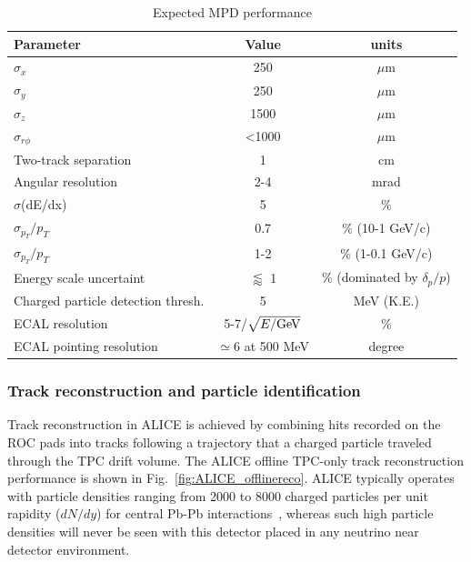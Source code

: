 \begin{table}[h]
    \centering
    \caption{Expected MPD performance}
\begin{tabular}{l|c|c}
\hline
Parameter	               & Value	                      & units \\
\hline
$\sigma_x$ 		           & 250	                      & $\mu$m\\
$\sigma_y$ 		           & 250	                      & $\mu$m\\
$\sigma_z$ 		           & 1500	                      & $\mu$m\\
$\sigma_{r\phi}$ 	       & <1000	                      & $\mu$m\\
Two-track separation       & 1		                      & cm \\
Angular resolution	       & 2-4	                      & mrad \\
$\sigma$(dE/dx)		       & 5		                      & \% \\ 
$\sigma_{p_T}/p_T$	       & 0.7	                      & \% (10-1 GeV/c)\\
$\sigma_{p_T}/p_T$	       & 1-2	                      & \% (1-0.1 GeV/c)\\
Energy scale uncertaint    & $\lessapprox$ 1              & \% (dominated by $\delta_p/p$) \\
Charged particle detection thresh. & 5                    & MeV (K.E.)\\
ECAL resolution	           & 5-7/$\sqrt{E/{\rm{GeV}}}$	  & \% \\
ECAL pointing resolution &  $\simeq 6$ at 500 MeV         & degree\\ 
\hline\hline
\end{tabular} 
 \label{tab:TPCperformance}
\end{table}
%

\subsubsection{Track reconstruction and particle identification}
Track reconstruction in ALICE is achieved by combining hits recorded on the ROC pads into tracks following a trajectory that a charged particle traveled through the TPC drift volume. The ALICE offline TPC-only track reconstruction performance is shown in Fig.~\ref{fig:ALICE_offlinereco}. ALICE typically operates with particle densities ranging from 2000 to 8000 charged particles per unit rapidity ($dN/dy$) for central Pb-Pb interactions~\cite{Cheshkov:2006ym}, whereas such high particle densities will never be seen with this detector placed in any neutrino near detector environment. 



